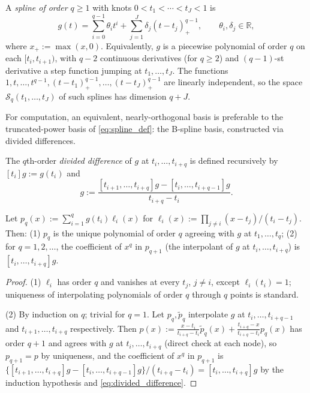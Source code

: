 \begin{definition}
\label{def:spline}
A \emph{spline of order $q\geq 1$} with knots $0<t_1<\cdots<t_J<1$ is
\begin{equation}
g(t) = \sum_{i=0}^{q-1}\theta_it^i + \sum_{j=1}^J\delta_j(t-t_j)_+^{q-1},
\qquad \theta_i,\delta_j\in\mathbb{R},
\label{eq:spline_def}
\end{equation}
where $x_+:=\max(x,0)$. Equivalently, $g$ is a piecewise polynomial of
order $q$ on each $[t_i,t_{i+1})$, with $q-2$ continuous derivatives (for
$q\geq 2$) and $(q-1)$-st derivative a step function jumping at
$t_1,\dots,t_J$. The functions $1,t,\dots,t^{q-1},(t-t_1)_+^{q-1},\dots,
(t-t_J)_+^{q-1}$ are linearly independent, so the space
$\mathcal{S}_q(t_1,\dots,t_J)$ of such splines has dimension $q+J$.
\end{definition}

For computation, an equivalent, nearly-orthogonal basis is preferable to
the truncated-power basis of \eqref{eq:spline_def}: the B-spline basis,
constructed via divided differences.

\begin{definition}
\label{def:divided_difference}
The $q$th-order \emph{divided difference} of $g$ at $t_i,\dots,t_{i+q}$ is
defined recursively by $[t_i]g:=g(t_i)$ and
\begin{equation}
[t_i,\dots,t_{i+q}]g := \frac{[t_{i+1},\dots,t_{i+q}]g -
[t_i,\dots,t_{i+q-1}]g}{t_{i+q}-t_i}.
\label{eq:divided_difference}
\end{equation}
\end{definition}

\begin{theorem}
\label{thm:divided_difference_interp}
Let $p_q(x):=\sum_{i=1}^qg(t_i)\ell_i(x)$ for $\ell_i(x):=\prod_{j\neq i}
(x-t_j)/(t_i-t_j)$. Then: (1) $p_q$ is the unique polynomial of order $q$
agreeing with $g$ at $t_1,\dots,t_q$; (2) for $q=1,2,\dots$, the coefficient
of $x^q$ in $p_{q+1}$ (the interpolant of $g$ at $t_i,\dots,t_{i+q}$) is
$[t_i,\dots,t_{i+q}]g$.
\end{theorem}

\begin{proof}
(1) $\ell_i$ has order $q$ and vanishes at every $t_j$, $j\neq i$, except
$\ell_i(t_i)=1$; uniqueness of interpolating polynomials of order $q$
through $q$ points is standard.

(2) By induction on $q$; trivial for $q=1$. Let $p_q,\widetilde{p}_q$
interpolate $g$ at $t_i,\dots,t_{i+q-1}$ and $t_{i+1},\dots,t_{i+q}$
respectively. Then $p(x):=\frac{x-t_i}{t_{i+q}-t_i}\widetilde{p}_q(x)+
\frac{t_{i+q}-x}{t_{i+q}-t_i}p_q(x)$ has order $q+1$ and agrees with $g$ at
$t_i,\dots,t_{i+q}$ (direct check at each node), so $p_{q+1}=p$ by
uniqueness, and the coefficient of $x^q$ in $p_{q+1}$ is $\{[t_{i+1},
\dots,t_{i+q}]g-[t_i,\dots,t_{i+q-1}]g\}/(t_{i+q}-t_i) = [t_i,\dots,
t_{i+q}]g$ by the induction hypothesis and \eqref{eq:divided_difference}.
\end{proof}

